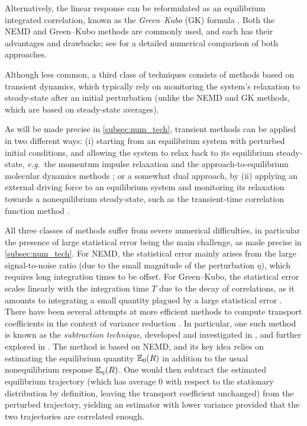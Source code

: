 Alternatively, the linear response can be reformulated as an equilibrium integrated correlation, known as the \emph{Green--Kubo} (GK) formula \cite{green,kubo}. Both the NEMD and Green--Kubo methods are commonly used, and each has their advantages and drawbacks; see \cite{mcqmc_stoltz2022} for a detailed numerical comparison of both approaches. 

Although less common, a third class of techniques consists of methods based on transient dynamics, which typically rely on monitoring the system's relaxation to steady-state after an initial perturbation (unlike the NEMD and GK methods, which are based on steady-state averages). 

As will be made precise in \cref{subsec:num_tech}, transient methods can be applied in two different ways: (i) starting from an equilibrium system with perturbed initial conditions, and allowing the system to relax back to its equilibrium steady-state, \emph{e.g.}\ the momentum impulse relaxation \cite{MIR2000} and the approach-to-equilibrium molecular dynamics methods \cite{AEMD2013}; or a somewhat dual approach, by (ii) applying an external driving force to an equilibrium system and monitoring its relaxation towards a nonequilibrium steady-state, such as the transient-time correlation function method \cite{TTCF1987,TTCF1988}.

All three classes of methods suffer from severe numerical difficulties, in particular the presence of large statistical error being the main challenge, as made precise in \cref{subsec:num_tech}. For NEMD, the statistical error mainly arises from the large signal-to-noise ratio (due to the small magnitude of the perturbation $\eta$), which requires long integration times to be offset. For Green--Kubo, the statistical error scales linearly with the integration time $T$ due to the decay of correlations, as it amounts to integrating a small quantity plagued by a large statistical error \cite{oliveira2017}.
%
There have been several attempts at more efficient methods to compute transport coefficients in the context of variance reduction \cite{mobility_urbain,synthetic2023,noe_fixing_flux}. In particular, one such method is known as the \emph{subtraction technique}, developed and investigated in \cite{ciccotti75}, and further explored in \cite{ciccotti79}. The method is based on NEMD, and its key idea relies on estimating the equilibrium quantity $\mathbb{E}_0(R)$ in addition to the usual nonequilibrium response $\mathbb{E}_\eta(R)$. One would then subtract the estimated equilibrium trajectory (which has average 0 with respect to the stationary distribution by definition, leaving the transport coefficient unchanged) from the perturbed trajectory, yielding an estimator with lower variance provided that the two trajectories are correlated enough.

